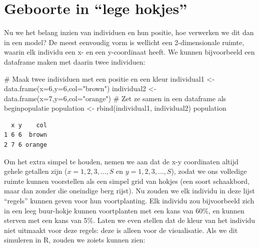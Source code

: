 \documentclass[
  a4paper,
]{scrbook}
\newenvironment{Shaded}{\begin{snugshade}}{\end{snugshade}}
\newcommand{\AttributeTok}[1]{\textcolor[rgb]{0.40,0.45,0.13}{#1}}
\newcommand{\CommentTok}[1]{\textcolor[rgb]{0.37,0.37,0.37}{#1}}
\newcommand{\DecValTok}[1]{\textcolor[rgb]{0.68,0.00,0.00}{#1}}
\newcommand{\FunctionTok}[1]{\textcolor[rgb]{0.28,0.35,0.67}{#1}}
\newcommand{\NormalTok}[1]{\textcolor[rgb]{0.00,0.23,0.31}{#1}}
\newcommand{\OtherTok}[1]{\textcolor[rgb]{0.00,0.23,0.31}{#1}}
\newcommand{\StringTok}[1]{\textcolor[rgb]{0.13,0.47,0.30}{#1}}
\theoremstyle{definition}
\theoremstyle{remark}
\begin{document}
\hypertarget{geboorte-in-lege-hokjes}{%
\section{Geboorte in ``lege hokjes''}\label{geboorte-in-lege-hokjes}}

Nu we het belang inzien van individuen en hun positie, hoe verwerken we
dit dan in een model? De meest eenvoudig vorm is wellicht een
2-dimensionale ruimte, waarin elk individu een x- en een y-coordinaat
heeft. We kunnen bijvoorbeeld een dataframe maken met daarin twee
individuen:

\begin{Shaded}
\begin{Highlighting}[]
\CommentTok{\# Maak twee individuen met een positie en een kleur}
\NormalTok{individual1 }\OtherTok{\textless{}{-}} \FunctionTok{data.frame}\NormalTok{(}\AttributeTok{x=}\DecValTok{6}\NormalTok{,}\AttributeTok{y=}\DecValTok{6}\NormalTok{,}\AttributeTok{col=}\StringTok{"brown"}\NormalTok{)}
\NormalTok{individual2 }\OtherTok{\textless{}{-}} \FunctionTok{data.frame}\NormalTok{(}\AttributeTok{x=}\DecValTok{7}\NormalTok{,}\AttributeTok{y=}\DecValTok{6}\NormalTok{,}\AttributeTok{col=}\StringTok{"orange"}\NormalTok{)}
\CommentTok{\# Zet ze samen in een dataframe als \textquotesingle{}beginpopulatie\textquotesingle{}}
\NormalTok{population }\OtherTok{\textless{}{-}} \FunctionTok{rbind}\NormalTok{(individual1, individual2)}
\NormalTok{population}
\end{Highlighting}
\end{Shaded}

\begin{verbatim}
  x y    col
1 6 6  brown
2 7 6 orange
\end{verbatim}

Om het extra simpel te houden, nemen we aan dat de x-y coordinaten
altijd gehele getallen zijn (\(x=1,2,3,\dots,S\) en
\(y=1,2,3,\dots,S\)), zodat we ons volledige ruimte kunnen voorstellen
als een simpel grid van hokjes (een soort schaakbord, maar dan zonder
die oneindige berg rijst). Nu zouden we elk individu in deze lijst
``regels'' kunnen geven voor hun voortplanting. Elk individu zou
bijvoorbeeld zich in een leeg buur-hokje kunnen voortplanten met een
kans van 60\%, en kunnen sterven met een kans van 5\%. Laten we even
stellen dat de kleur van het individu niet uitmaakt voor deze regels:
deze is alleen voor de visualisatie. Als we dit simuleren in R, zouden
we zoiets kunnen zien:
\end{document}
